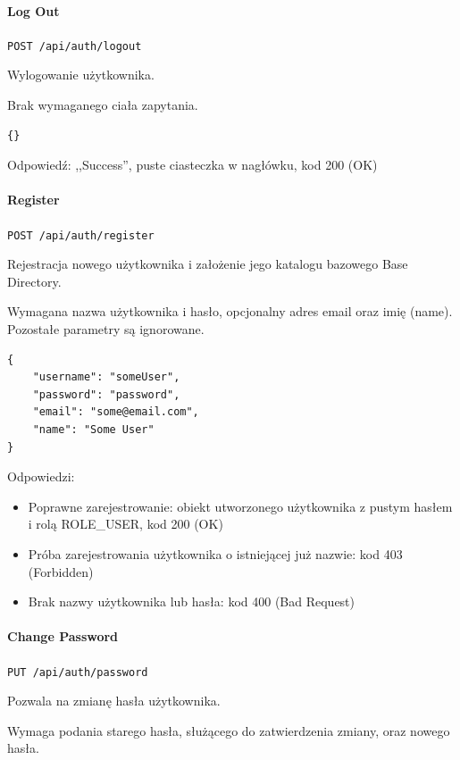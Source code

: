 \documentclass[a4paper,twoside,12pt]{book}
\begin{document}
\paragraph{Log Out} 

\texttt{POST /api/auth/logout}



Wylogowanie użytkownika.

Brak wymaganego ciała zapytania.

\begin{verbatim}
{}
\end{verbatim}

Odpowiedź: ,,Success'', puste ciasteczka w nagłówku, kod 200 (OK)

\paragraph{Register}\label{register}

\texttt{POST /api/auth/register}

Rejestracja nowego użytkownika i założenie jego katalogu bazowego Base Directory.

Wymagana nazwa użytkownika i hasło, opcjonalny adres email oraz imię (name). Pozostałe parametry są ignorowane.

\begin{verbatim}
{
    "username": "someUser",
    "password": "password",
    "email": "some@email.com",
    "name": "Some User"
}
\end{verbatim}

Odpowiedzi: 
\begin{itemize}
	\item Poprawne zarejestrowanie: obiekt utworzonego użytkownika z pustym hasłem i rolą ROLE\_USER, kod 200 (OK) 
	\item Próba zarejestrowania użytkownika o istniejącej już nazwie: kod 403 (Forbidden) 
	\item Brak nazwy użytkownika lub hasła: kod 400 (Bad Request)
\end{itemize}

\paragraph{Change Password}\label{change-password}

\texttt{PUT /api/auth/password}

Pozwala na zmianę hasła użytkownika.

Wymaga podania starego hasła, służącego do zatwierdzenia zmiany, oraz nowego hasła.
\end{document}
